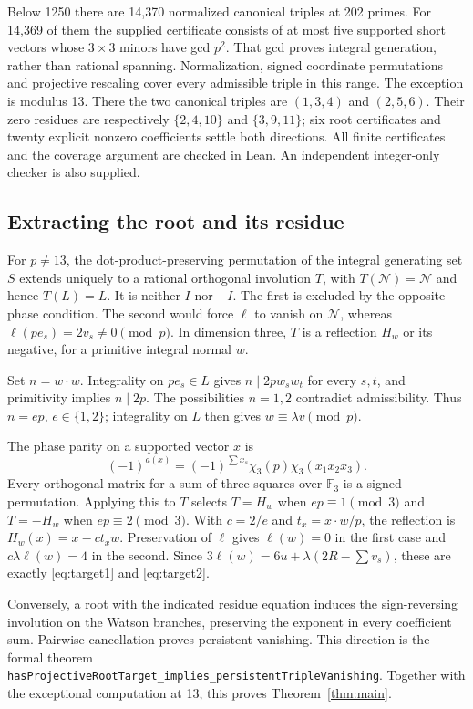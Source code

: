 \documentclass[11pt]{amsart}
\newcommand{\F}{\mathbb F}
\newcommand{\lean}[1]{{\small\nolinkurl{#1}}}
\theoremstyle{definition}
\begin{document}
Below 1250 there are 14,370 normalized canonical triples at 202 primes.
For 14,369 of them the supplied certificate consists of at most five
supported short vectors whose $3\times3$ minors have gcd $p^2$.
That gcd proves integral generation, rather than rational spanning.
Normalization, signed coordinate permutations and projective rescaling
cover every admissible triple in this range. The exception is modulus 13.
There the two canonical triples are $(1,3,4)$ and $(2,5,6)$.
Their zero residues are respectively $\{2,4,10\}$ and $\{3,9,11\}$;
six root certificates and twenty explicit nonzero coefficients settle
both directions. All finite certificates and the coverage argument are
checked in Lean. An independent integer-only checker is also supplied.

\subsection{Extracting the root and its residue}
For $p\ne13$, the dot-product-preserving permutation of the integral
generating set $S$ extends uniquely to a rational orthogonal involution
$T$, with $T(\mathcal N)=\mathcal N$ and hence $T(L)=L$.
It is neither $I$ nor $-I$. The first is excluded by the opposite-phase
condition. The second would force $\ell$ to vanish on $\mathcal N$,
whereas $\ell(pe_s)=2v_s\ne0\pmod p$.
In dimension three, $T$ is a reflection $H_w$ or its negative, for a
primitive integral normal $w$.

Set $n=w\cdot w$. Integrality on $pe_s\in L$ gives
$n\mid2p w_s w_t$ for every $s,t$, and primitivity implies $n\mid2p$.
The possibilities $n=1,2$ contradict admissibility. Thus $n=ep$,
$e\in\{1,2\}$; integrality on $L$ then gives $w\equiv\lambda v\pmod p$.

The phase parity on a supported vector $x$ is
\[
 (-1)^{a(x)}=(-1)^{\sum x_s}\chi_3(p)\chi_3(x_1x_2x_3).
\]
Every orthogonal matrix for a sum of three squares over $\F_3$ is a
signed permutation. Applying this to $T$ selects $T=H_w$ when
$ep\equiv1\pmod3$ and $T=-H_w$ when $ep\equiv2\pmod3$.
With $c=2/e$ and $t_x=x\cdot w/p$, the reflection is
$H_w(x)=x-ct_xw$. Preservation of $\ell$ gives $\ell(w)=0$ in
the first case and $c\lambda\ell(w)=4$ in the second.
Since $3\ell(w)=6u+\lambda(2R-\sum v_s)$, these are exactly
\eqref{eq:target1} and \eqref{eq:target2}.

Conversely, a root with the indicated residue equation induces the
sign-reversing involution on the Watson branches, preserving the
exponent in every coefficient sum. Pairwise cancellation proves
persistent vanishing. This direction is the formal theorem
\lean{hasProjectiveRootTarget_implies_persistentTripleVanishing}.
Together with the exceptional computation at 13, this proves
Theorem~\ref{thm:main}.
\end{document}
